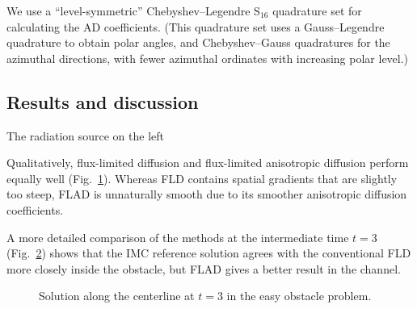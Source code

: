 We use a ``level-symmetric'' Chebyshev--Legendre S$_{16}$ quadrature set for
calculating the AD coefficients. (This quadrature set uses a Gauss--Legendre
quadrature to obtain polar angles, and Chebyshev--Gauss quadratures for the
azimuthal directions, with fewer azimuthal ordinates with increasing polar
level.)

\subsection{Results and discussion}

The radiation source on the left 

Qualitatively, flux-limited diffusion and flux-limited anisotropic diffusion
perform equally well (Fig.~\ref{fig:easymkContour}). Whereas FLD contains spatial gradients that are slightly
too steep, FLAD is unnaturally smooth due to its smoother anisotropic diffusion
coefficients.

\begin{figure}[htb]
  \centering


  \label{fig:easymkContour}
\end{figure}

A more detailed comparison of the methods at the intermediate time $t=3$
(Fig.~\ref{fig:easymkCenterline}) shows that the IMC reference solution agrees
with the conventional FLD more closely inside the obstacle, but FLAD gives a
better result in the channel.
\begin{figure}[htb]
  \centering
  \caption{Solution along the centerline at $t=3$ in the easy obstacle
  problem.}
  \label{fig:easymkCenterline}
\end{figure}

